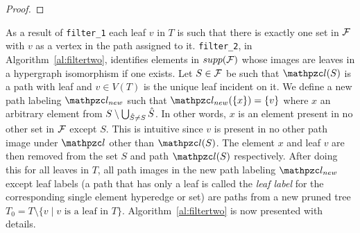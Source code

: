 \begin{proof}
\end{proof}

As a result of {\tt filter\_1} each leaf $v$ in $T$ is such that there
is exactly one set in ${\cal F}$ with $v$ as a vertex in the path assigned
to it.  {\tt filter\_2}, in Algorithm~\ref{al:filtertwo}, identifies
elements in $supp({\cal F})$ whose images are leaves in a hypergraph
isomorphism if one exists.  Let $S \in {\cal F}$ be such that $\cl(S)$ is a
path with leaf and $v \in V(T)$ is the unique leaf incident on it.  We
define a new path labeling $\cl_{new}$ such that $\cl_{new}(\set{x}) =
\set{v}$ where $x$ an arbitrary element from $S \setminus \bigcup_{{\hat S}
  \ne S} {\hat S}$. In other words, $x$ is an element present in no other
set in ${\cal F}$ except $S$. This is intuitive since $v$ is present in no
other path image under $\cl$ other than $\cl(S)$.  The element $x$ and
leaf $v$ are then removed from the set $S$ and path $\cl(S)$
respectively. After doing this for all leaves in $T$, all path images
in the new path labeling $\cl_{new}$ except leaf labels (a path that
has only a leaf is called the {\em leaf label} for the corresponding
single element hyperedge or set) are paths from a new pruned tree $T_0
= T \setminus \{v \mid v \text{ is a leaf in }
T\}$. Algorithm~\ref{al:filtertwo} is now presented with details.


